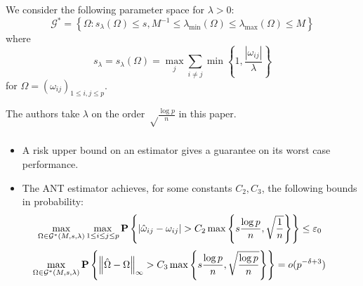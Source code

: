 \begin{frame}[fragile] \frametitle{}
    \vspace{0.5cm}

    We consider the following parameter space for $\lambda > 0$:
    $$
    \mathcal{G}^* = \left\{
    \Omega: s_\lambda(\Omega) \leq s, M^{-1}
        \leq \lambda_\mathrm{min}(\Omega)
        \leq \lambda_\mathrm{max}(\Omega)
        \leq M
    \right\}
    $$
    where
    $$
    s_\lambda = s_\lambda(\Omega) = \max_j\sum_{i\neq j}
    \min\left\{1, \frac{|\omega_{ij}|}{\lambda}\right\}
    $$
    for $\Omega = (\omega_{ij})_{1\leq i, j\leq p}$.

    The authors take $\lambda$ on the order $\sqrt\frac{\log p}{n}$ in this
    paper.

\end{frame}
\begin{frame}[fragile] \frametitle{}

    \begin{itemize}
        \item A risk upper bound on an estimator gives a guarantee on its
            worst case performance.
        \item The ANT estimator achieves, for some constants $C_2, C_3$,
            the following bounds in probability:
            \begin{align*}
                \hspace{-0.8cm}
            \max_{\Omega\in\Gg^*(M, s, \lambda)}\max_{1 \leq i \leq j \leq p}
            \PP\left\{
            |\hat\omega_{ij} - \omega_{ij}| > C_2 \max\left\{
            s\frac{\log p}{n}, \sqrt\frac{1}{n}
            \right\}
            \right\} \leq \varepsilon_0
            \end{align*}
            \begin{align*}
                \hspace{-0.8cm}
            \max_{\Omega\in\Gg^*(M, s, \lambda)}
            \PP\left\{
            \norm{\hat\Omega - \Omega}_\infty > C_3 \max\left\{
            s\frac{\log p}{n}, \sqrt\frac{\log p}{n}
            \right\}
            \right\} = o(p^{-\delta + 3})
            \end{align*}
    \end{itemize}
\end{frame}
